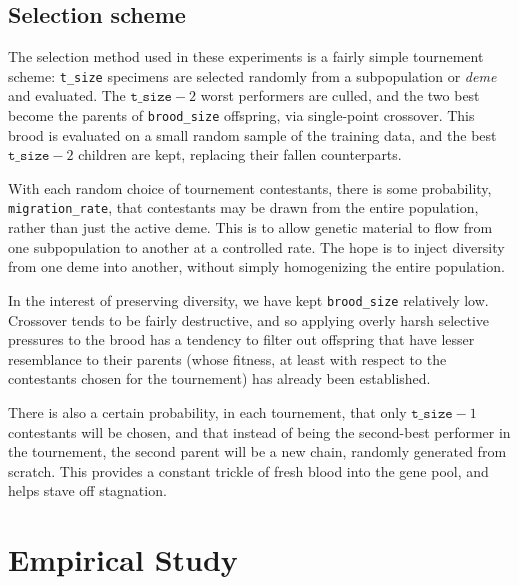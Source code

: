 \subsection{Selection scheme}

The selection method used in these experiments is a fairly simple
tournement scheme: \texttt{t\_size} specimens are selected randomly from a
subpopulation or \emph{deme} and evaluated. The
$\texttt{t\_size}-2$ worst
performers are culled, and the two best become the parents of
\texttt{brood\_size} offspring, via single-point crossover. This
brood is evaluated on a small random sample of the training data,
and the best $\texttt{t\_size} - 2$ children are kept, replacing
their fallen counterparts. 

With each random choice of tournement contestants, there is some
probability, \texttt{migration\_rate}, that contestants may be
drawn from the entire population, rather than just the active
deme. This is to allow genetic material to flow from one
subpopulation to another at a controlled rate. The hope is to
inject diversity from one deme into another, without simply
homogenizing the entire population. 

In the interest of preserving diversity, we have kept
\texttt{brood\_size} relatively low. Crossover tends to be fairly
destructive, and so applying overly harsh selective pressures to
the brood has a tendency to filter out offspring that have lesser
resemblance to their parents (whose fitness, at least with
respect to the contestants chosen for the tournement) has already
been established. 

There is also a certain probability, in each tournement, that
only $\texttt{t\_size} - 1$ contestants will be chosen, and that
instead of being the second-best performer in the tournement, the
second parent will be a new chain, randomly generated from
scratch. This provides a constant trickle of fresh blood into the
gene pool, and helps stave off stagnation.



\section{Empirical Study}




